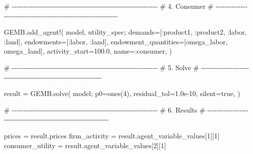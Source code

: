 \documentclass[
  letterpaper,
  DIV=11,
  numbers=noendperiod]{scrreprt}
\newenvironment{Shaded}{\begin{snugshade}}{\end{snugshade}}
\newcommand{\CommentTok}[1]{\textcolor[rgb]{0.37,0.37,0.37}{#1}}
\newcommand{\ConstantTok}[1]{\textcolor[rgb]{0.56,0.35,0.01}{#1}}
\newcommand{\FloatTok}[1]{\textcolor[rgb]{0.68,0.00,0.00}{#1}}
\newcommand{\FunctionTok}[1]{\textcolor[rgb]{0.28,0.35,0.67}{#1}}
\newcommand{\NormalTok}[1]{\textcolor[rgb]{0.00,0.23,0.31}{#1}}
\newcommand{\OperatorTok}[1]{\textcolor[rgb]{0.37,0.37,0.37}{#1}}
\begin{document}
\begin{codelisting}
{\begin{Shaded}
\begin{Highlighting}[]
\CommentTok{\# {-}{-}{-}{-}{-}{-}{-}{-}{-}{-}{-}{-}{-}{-}{-}{-}{-}{-}{-}{-}{-}{-}{-}{-}{-}{-}{-}{-}{-}{-}{-}{-}{-}{-}{-}{-}{-}{-}{-}{-}{-}{-}{-}{-}{-}{-}{-}{-}{-}{-}{-}{-}{-}{-}{-}{-}{-}{-}{-}{-}{-}{-}{-}{-}}
\CommentTok{\# 4. Consumer}
\CommentTok{\# {-}{-}{-}{-}{-}{-}{-}{-}{-}{-}{-}{-}{-}{-}{-}{-}{-}{-}{-}{-}{-}{-}{-}{-}{-}{-}{-}{-}{-}{-}{-}{-}{-}{-}{-}{-}{-}{-}{-}{-}{-}{-}{-}{-}{-}{-}{-}{-}{-}{-}{-}{-}{-}{-}{-}{-}{-}{-}{-}{-}{-}{-}{-}{-}}

\NormalTok{GEMB.}\FunctionTok{add\_agent!}\NormalTok{(}
\NormalTok{    model,}
\NormalTok{    utility\_spec;}
\NormalTok{    demands}\OperatorTok{=}\NormalTok{[}\OperatorTok{:}\NormalTok{product1, }\OperatorTok{:}\NormalTok{product2, }\OperatorTok{:}\NormalTok{labor, }\OperatorTok{:}\NormalTok{land],}
\NormalTok{    endowments}\OperatorTok{=}\NormalTok{[}\OperatorTok{:}\NormalTok{labor, }\OperatorTok{:}\NormalTok{land],}
\NormalTok{    endowment\_quantities}\OperatorTok{=}\NormalTok{[omega\_labor, omega\_land],}
\NormalTok{    activity\_start}\OperatorTok{=}\FloatTok{100.0}\NormalTok{,}
\NormalTok{    name}\OperatorTok{=:}\NormalTok{consumer,}
\NormalTok{)}


\CommentTok{\# {-}{-}{-}{-}{-}{-}{-}{-}{-}{-}{-}{-}{-}{-}{-}{-}{-}{-}{-}{-}{-}{-}{-}{-}{-}{-}{-}{-}{-}{-}{-}{-}{-}{-}{-}{-}{-}{-}{-}{-}{-}{-}{-}{-}{-}{-}{-}{-}{-}{-}{-}{-}{-}{-}{-}{-}{-}{-}{-}{-}{-}{-}{-}{-}}
\CommentTok{\# 5. Solve}
\CommentTok{\# {-}{-}{-}{-}{-}{-}{-}{-}{-}{-}{-}{-}{-}{-}{-}{-}{-}{-}{-}{-}{-}{-}{-}{-}{-}{-}{-}{-}{-}{-}{-}{-}{-}{-}{-}{-}{-}{-}{-}{-}{-}{-}{-}{-}{-}{-}{-}{-}{-}{-}{-}{-}{-}{-}{-}{-}{-}{-}{-}{-}{-}{-}{-}{-}}

\NormalTok{result }\OperatorTok{=}\NormalTok{ GEMB.}\FunctionTok{solve}\NormalTok{(}
\NormalTok{    model;}
\NormalTok{    p0}\OperatorTok{=}\FunctionTok{ones}\NormalTok{(}\FloatTok{4}\NormalTok{),}
\NormalTok{    residual\_tol}\OperatorTok{=}\FloatTok{1.0e{-}10}\NormalTok{,}
\NormalTok{    silent}\OperatorTok{=}\ConstantTok{true}\NormalTok{,}
\NormalTok{)}


\CommentTok{\# {-}{-}{-}{-}{-}{-}{-}{-}{-}{-}{-}{-}{-}{-}{-}{-}{-}{-}{-}{-}{-}{-}{-}{-}{-}{-}{-}{-}{-}{-}{-}{-}{-}{-}{-}{-}{-}{-}{-}{-}{-}{-}{-}{-}{-}{-}{-}{-}{-}{-}{-}{-}{-}{-}{-}{-}{-}{-}{-}{-}{-}{-}{-}{-}}
\CommentTok{\# 6. Results}
\CommentTok{\# {-}{-}{-}{-}{-}{-}{-}{-}{-}{-}{-}{-}{-}{-}{-}{-}{-}{-}{-}{-}{-}{-}{-}{-}{-}{-}{-}{-}{-}{-}{-}{-}{-}{-}{-}{-}{-}{-}{-}{-}{-}{-}{-}{-}{-}{-}{-}{-}{-}{-}{-}{-}{-}{-}{-}{-}{-}{-}{-}{-}{-}{-}{-}{-}}

\NormalTok{prices }\OperatorTok{=}\NormalTok{ result.prices}
\NormalTok{firm\_activity }\OperatorTok{=}\NormalTok{ result.agent\_variable\_values[}\FloatTok{1}\NormalTok{][}\FloatTok{1}\NormalTok{]}
\NormalTok{consumer\_utility }\OperatorTok{=}\NormalTok{ result.agent\_variable\_values[}\FloatTok{2}\NormalTok{][}\FloatTok{1}\NormalTok{]}


\end{Highlighting}
\end{Shaded}}
\end{codelisting}
\end{document}
